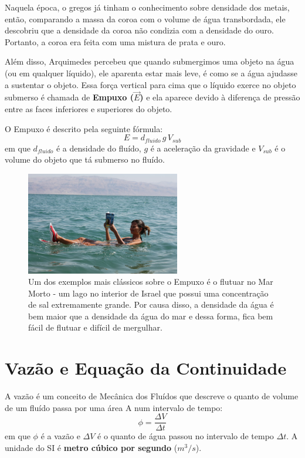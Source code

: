 \documentclass[12pt]{extarticle}
\newcommand{\<}{\langle}
\renewcommand{\>}{\rangle}
\theoremstyle{definition}
\begin{document}
Naquela época, o gregos já tinham o conhecimento sobre densidade dos metais, então, comparando a massa da coroa com o volume de água transbordada, ele descobriu que a densidade da coroa não condizia com a densidade do ouro. Portanto, a coroa era feita com uma mistura de prata e ouro.

Além disso, Arquimedes percebeu que quando submergimos uma objeto na água (ou em qualquer líquido), ele aparenta estar mais leve, é como se a água ajudasse a sustentar o objeto. Essa força vertical para cima que o líquido exerce no objeto submerso é chamada de \textbf{Empuxo ($\vec{E}$)} e ela aparece devido à diferença de pressão entre as faces inferiores e superiores do objeto.

O Empuxo é descrito pela seguinte fórmula:
\begin{equation}
    E = d_{fluido}\,g\,V_{sub}
\end{equation}
\noindent em que $d_{fluido}$ é a densidade do fluído, $g$ é a aceleração da gravidade e $V_{sub}$ é o volume do objeto que tá submerso no fluído.
\begin{figure}[H]
    \centering
    \includegraphics[width=0.6\textwidth]{mar_morto.JPG}
    \caption{Um dos exemplos mais clássicos sobre o Empuxo é o flutuar no Mar Morto - um lago no interior de Israel que possui uma concentração de sal extremamente grande. Por causa disso, a densidade da água é bem maior que a densidade da água do mar e dessa forma, fica bem fácil de flutuar e difícil de mergulhar.}
    \label{fig:mar_morto}
\end{figure}

\section{Vazão e Equação da Continuidade}
A vazão é um conceito de Mecânica dos Fluídos que descreve o quanto de volume de um fluído passa por uma área A num intervalo de tempo:
\begin{equation}
    \phi = \frac{\Delta V}{\Delta t}
\end{equation}
\noindent em que $\phi$ é a vazão e $\Delta V$ é o quanto de água passou no intervalo de tempo $\Delta t$. A unidade do SI é \textbf{metro cúbico por segundo} ($m^3/s$).
\end{document}
